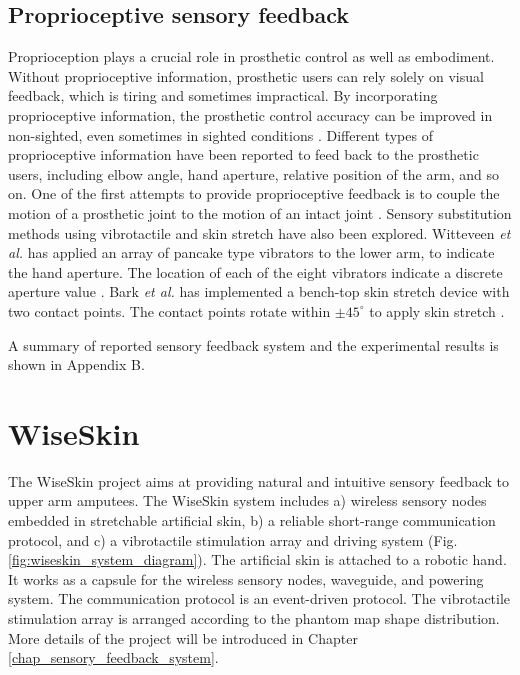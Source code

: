\subsection{Proprioceptive sensory feedback}
Proprioception plays a crucial role in prosthetic control as well as embodiment. Without proprioceptive information, prosthetic users can rely solely on visual feedback, which is tiring and sometimes impractical. By incorporating proprioceptive information, the prosthetic control accuracy can be improved in non-sighted, even sometimes in sighted conditions \cite{blank2010identifying}. Different types of proprioceptive information  have been reported to feed back to the prosthetic users, including elbow angle, hand aperture, relative position of the arm, and so on. One of the first attempts to provide proprioceptive feedback is to couple the motion of a prosthetic joint to the motion of an intact joint \cite{simpson1974choice, pistohl2015artificial}. Sensory substitution methods using vibrotactile \cite{kapur2010spatially, witteveen2015vibrotactile, bark2008comparison} and skin stretch have also been explored. Witteveen \textit{et al.} has applied an array of pancake type vibrators to the lower arm, to indicate the hand aperture. The location of each of the eight vibrators indicate a discrete aperture value \cite{witteveen2015vibrotactile}.  Bark \textit{et al.} has implemented a bench-top skin stretch device with two contact points. The contact points rotate within $\pm 45 ^{\circ} $ to apply skin stretch \cite{bark2008comparison}. 


A summary of reported sensory feedback system and the experimental results is shown in Appendix B. 


\section{WiseSkin}
The WiseSkin project aims at providing natural and intuitive sensory feedback to upper arm amputees. The WiseSkin system includes a) wireless sensory nodes embedded in stretchable artificial skin, b) a reliable short-range communication protocol, and c) a vibrotactile stimulation array and driving system  (Fig. \ref{fig:wiseskin_system_diagram}). The artificial skin is attached to a robotic hand. It works as a capsule for the wireless sensory nodes, waveguide, and powering system. The communication protocol is an event-driven protocol. The vibrotactile stimulation array is arranged according to the phantom map shape distribution. More details of the project will be introduced in Chapter \ref{chap_sensory_feedback_system}. 

